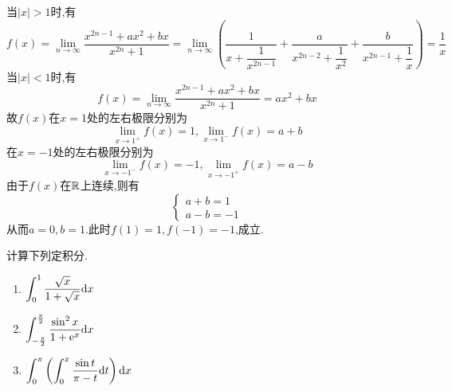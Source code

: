 \documentclass{ctexart}
\begin{document}
\begin{solution}
    当$\left|x\right|>1$时,有$$f(x)=\lim_{n\to\infty}{\dfrac{x^{2n-1}+ax^2+bx}{x^{2n}+1}}=\lim_{n\to\infty}\left(\dfrac{1}{x+\dfrac{1}{x^{2n-1}}}+\dfrac{a}{x^{2n-2}+\dfrac{1}{x^2}}+\dfrac{b}{x^{2n-1}+\dfrac{1}{x}}\right)=\dfrac{1}{x}$$
    当$\left|x\right|<1$时,有$$f(x)=\lim_{n\to\infty}{\dfrac{x^{2n-1}+ax^2+bx}{x^{2n}+1}}=ax^2+bx$$
    故$f(x)$在$x=1$处的左右极限分别为$$\lim_{x\to1^+}f(x)=1,\lim_{x\to1^-}f(x)=a+b$$
    在$x=-1$处的左右极限分别为$$\lim_{x\to-1^-}f(x)=-1,\lim_{x\to-1^+}f(x)=a-b$$
    由于$f(x)$在$\mathbb{R}$上连续,则有
    $$\left\{\begin{array}{l}
        a+b=1 \\
        a-b=-1
    \end{array}
    \right.$$
    从而$a=0,b=1$.此时$f(1)=1,f(-1)=-1$,成立.
\end{solution}
\begin{problem}[5.(15\songti{分})]
    计算下列定积分.
    \begin{enumerate}[label=\textbf{(\arabic*)}]
        \item $\displaystyle\int_0^1\dfrac{\sqrt{x}}{1+\sqrt{x}}\mathrm{d} x$
        \item $\displaystyle\int_{-\frac{\pi}{2}}^{\frac{\pi}{2}}\dfrac{\sin^2x}{1+\mathrm{e}^x}\mathrm{d} x$
        \item $\displaystyle\int_{0}^{\pi}\left(\int_{0}^{x}\dfrac{\sin t}{\pi-t}\mathrm{d} t\right)\mathrm{d} x$
    \end{enumerate}
\end{problem}
\end{document}
